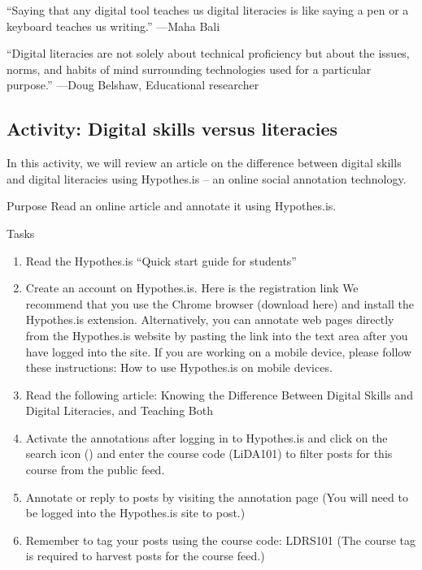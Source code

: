 \documentclass[
]{book}
\providecommand{\tightlist}{%
  \setlength{\itemsep}{0pt}\setlength{\parskip}{0pt}}
\theoremstyle{definition}
\theoremstyle{definition}
\theoremstyle{definition}
\theoremstyle{definition}
\theoremstyle{remark}
\begin{document}
``Saying that any digital tool teaches us digital literacies is like saying a pen or a keyboard teaches us writing.''
---Maha Bali
\citet{Bali_Maha}

``Digital literacies are not solely about technical proficiency but about the issues, norms, and habits of mind surrounding technologies used for a particular purpose.''
---Doug Belshaw, Educational researcher

\hypertarget{activity-digital-skills-versus-literacies}{%
\subsection*{Activity: Digital skills versus literacies}\label{activity-digital-skills-versus-literacies}}

\begin{reflect}
In this activity, we will review an article on the difference between digital skills and digital literacies using Hypothes.is -- an online social annotation technology.

Purpose
Read an online article and annotate it using Hypothes.is.

Tasks

\begin{enumerate}
\def\labelenumi{\arabic{enumi}.}
\tightlist
\item
  Read the Hypothes.is ``Quick start guide for students''
\item
  Create an account on Hypothes.is. Here is the registration link
  We recommend that you use the Chrome browser (download here) and install the Hypothes.is extension. Alternatively, you can annotate web pages directly from the Hypothes.is website by pasting the link into the text area after you have logged into the site. If you are working on a mobile device, please follow these instructions: How to use Hypothes.is on mobile devices.
\item
  Read the following article: Knowing the Difference Between Digital Skills and Digital Literacies, and Teaching Both
\item
  Activate the annotations after logging in to Hypothes.is and click on the search icon () and enter the course code (LiDA101) to filter posts for this course from the public feed.
\item
  Annotate or reply to posts by visiting the annotation page (You will need to be logged into the Hypothes.is site to post.)
\item
  Remember to tag your posts using the course code: LDRS101 (The course tag is required to harvest posts for the course feed.)
\end{enumerate}
\end{reflect}
\end{document}
